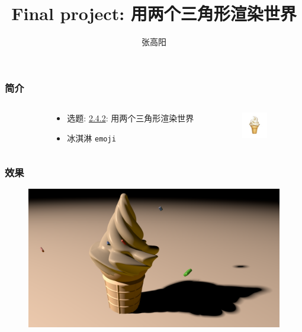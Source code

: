 \documentclass[aspectratio=169]{ctexbeamer} %
\title{Final project: 用两个三角形渲染世界}
\author{张高阳}
\begin{document}
\begin{frame}
    \titlepage 
\end{frame}

\begin{frame}
    \frametitle{简介}
    \begin{columns}
        \begin{column}{.1\textwidth}\end{column}
        \begin{column}{.5\textwidth}
            \begin{itemize}
                \item 选题: \underline{2.4.2}: 用两个三角形渲染世界
                \item 冰淇淋 \texttt{emoji}
            \end{itemize}
        \end{column}
        \begin{column}{.4\textwidth}
            \includegraphics[width=32pt]{images/pre/emoji.pdf}
        \end{column}
    \end{columns}
\end{frame}

\begin{frame}
    \frametitle{效果}
    \begin{figure}[htbp]
        \centering
        \includegraphics[height=.85\textheight]{images/pre/full.pdf}
        \caption{}
        \label{fig:full}
    \end{figure}
\end{frame}
\end{document}
